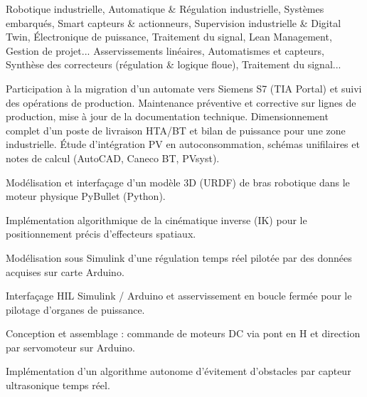 \documentclass[10pt,a4paper]{../altacv}
\begin{document}
\cvidentite
{}
\makecvheader

\cvformation
{Robotique industrielle, Automatique \& Régulation industrielle, Systèmes embarqués, Smart capteurs \& actionneurs, Supervision industrielle \& Digital Twin, Électronique de puissance, Traitement du signal, Lean Management, Gestion de projet...}
{Asservissements linéaires, Automatismes et capteurs, Synthèse des correcteurs (régulation \& logique floue), Traitement du signal...}

\expmenara
{Participation à la migration d’un automate vers Siemens S7 (TIA Portal) et suivi des opérations de production.}
{Maintenance préventive et corrective sur lignes de production, mise à jour de la documentation technique.}
\vspace{2pt}
\expcore
{Dimensionnement complet d’un poste de livraison HTA/BT et bilan de puissance pour une zone industrielle.}
{Étude d’intégration PV en autoconsommation, schémas unifilaires et notes de calcul (AutoCAD, Caneco BT, PVsyst).}

\begin{cvitems}
  \item Modélisation et interfaçage d’un modèle 3D (URDF) de bras robotique dans le moteur physique PyBullet (Python).
  \item Implémentation algorithmique de la cinématique inverse (IK) pour le positionnement précis d’effecteurs spatiaux.
\end{cvitems}
\vspace{2pt}
\begin{cvitems}
  \item Modélisation sous Simulink d’une régulation temps réel pilotée par des données acquises sur carte Arduino.
  \item Interfaçage HIL Simulink / Arduino et asservissement en boucle fermée pour le pilotage d’organes de puissance.
\end{cvitems}
\vspace{2pt}
\begin{cvitems}
  \item Conception et assemblage : commande de moteurs DC via pont en H et direction par servomoteur sur Arduino.
  \item Implémentation d’un algorithme autonome d’évitement d’obstacles par capteur ultrasonique temps réel.
\end{cvitems}
\end{document}
